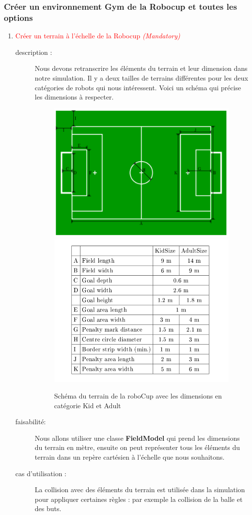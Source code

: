 \documentclass[11pt, a4paper]{article}
\newcommand{\besoinVItem}[4]{
	\item #1
	\begin{description}
		\item[description :]
		#2
		\item[faisabilité: ]
		#3
		\item[cas d'utilisation :]
		#4
	\end{description}
}
\begin{document}
	\subsubsection{Créer un environnement Gym de la Robocup et toutes les options  }
	\begin{enumerate}

		\besoinVItem{\textcolor{red}{Créer un terrain à l'échelle de la Robocup \textit{(Mandatory)}}}
		{Nous devons retranscrire les éléments du terrain et leur dimension dans notre simulation. Il y a deux tailles de terrains différentes pour les deux catégories de robots qui nous intéressent. Voici un schéma qui précise les dimensions à respecter.
			\begin{figure}[H]
				\centering
				\includegraphics[scale=0.8]{images/ter.PNG}\includegraphics[scale=0.45]{images/dim_ter.PNG}
				\caption {Schéma du terrain de la roboCup avec les dimensions en catégorie Kid et Adult \cite{robocuprules} }
			\end{figure}
		}
		{Nous allons utiliser une classe \textbf{FieldModel} qui prend les dimensions du terrain en mètre, ensuite on peut représenter tous les éléments du terrain dans un repère cartésien à l'échelle que nous souhaitons.
		}{La collision avec des éléments du terrain est utilisée dans la simulation pour appliquer certaines règles : par exemple la collision de la balle et des buts.\\ }


\end{enumerate}
\end{document}
